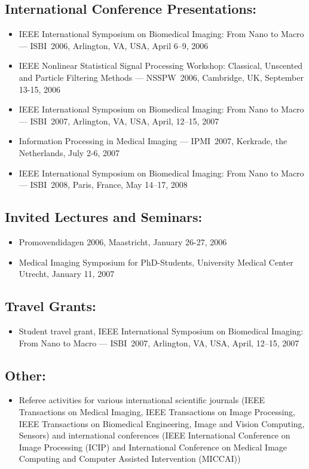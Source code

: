 \subsection*{International Conference Presentations:}
\vspace{1ex}
\begin{itemize}
\item IEEE International Symposium on Biomedical Imaging: From Nano to Macro --- ISBI~2006,
Arlington, VA, USA, April 6--9, 2006
\item IEEE Nonlinear Statistical Signal Processing Workshop: Classical,
    Unscented and Particle Filtering Methods --- NSSPW~2006, Cambridge, UK, September 13-15, 2006
\item IEEE International Symposium on Biomedical Imaging: From Nano to
  Macro --- ISBI~2007, Arlington, VA, USA, April, 12--15, 2007
\item Information Processing in Medical Imaging --- IPMI~2007, Kerkrade, the Netherlands, July 2-6,
2007
\item IEEE International Symposium on Biomedical Imaging: From Nano to
  Macro --- ISBI~2008, Paris, France, May 14--17, 2008
\end{itemize}

\subsection*{Invited Lectures and Seminars:}
\vspace{1ex}
\begin{itemize}
\item Promovendidagen 2006, Maastricht, January 26-27, 2006
\item Medical Imaging Symposium for PhD-Students, University Medical Center Utrecht, January 11, 2007
\end{itemize}

\subsection*{Travel Grants:}
\vspace{1ex}
\begin{itemize}
\item Student travel grant, IEEE International Symposium on Biomedical Imaging: From Nano to
  Macro --- ISBI~2007, Arlington, VA, USA, April, 12--15, 2007
\end{itemize}

\subsection*{Other:}
\vspace{1ex}
\begin{itemize}
\item Referee activities for various international scientific journals
 (IEEE Transactions on Medical Imaging, IEEE
  Transactions on Image Processing, IEEE Transactions on Biomedical
  Engineering, Image and Vision Computing, Sensors) and international
  conferences (IEEE International Conference on Image
    Processing (ICIP) and International Conference on Medical Image Computing and Computer
    Assisted Intervention (MICCAI))
\end{itemize}
